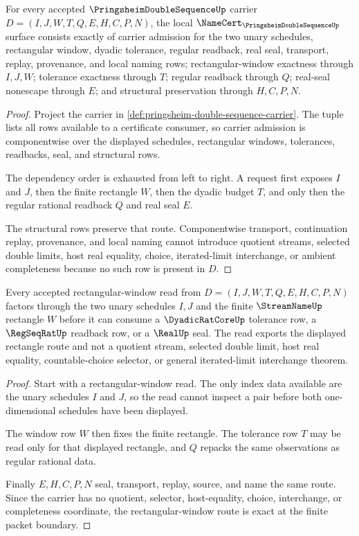 \begin{theorem}
\label{thm:pringsheim-double-sequence-namecert-obligations}
For every accepted $\PringsheimDoubleSequenceUp$ carrier $D=(I,J,W,T,Q,E,H,C,P,N)$, the local $\NameCert_{\PringsheimDoubleSequenceUp}$ surface consists exactly of carrier admission for the two unary schedules, rectangular window, dyadic tolerance, regular readback, real seal, transport, replay, provenance, and local naming rows; rectangular-window exactness through $I,J,W$; tolerance exactness through $T$; regular readback through $Q$; real-seal nonescape through $E$; and structural preservation through $H,C,P,N$.
\end{theorem}
\begin{proof}
Project the carrier in \autoref{def:pringsheim-double-sequence-carrier}. The tuple lists all rows available to a certificate consumer, so carrier admission is componentwise over the displayed schedules, rectangular windows, tolerances, readbacks, seal, and structural rows.

The dependency order is exhausted from left to right. A request first exposes $I$ and $J$, then the finite rectangle $W$, then the dyadic budget $T$, and only then the regular rational readback $Q$ and real seal $E$.

The structural rows preserve that route. Componentwise transport, continuation replay, provenance, and local naming cannot introduce quotient streams, selected double limits, host real equality, choice, iterated-limit interchange, or ambient completeness because no such row is present in $D$.
\end{proof}

\begin{theorem}
\label{thm:pringsheim-double-sequence-rectangular-window-exactness}
Every accepted rectangular-window read from $D=(I,J,W,T,Q,E,H,C,P,N)$ factors through the two unary schedules $I,J$ and the finite $\StreamNameUp$ rectangle $W$ before it can consume a $\DyadicRatCoreUp$ tolerance row, a $\RegSeqRatUp$ readback row, or a $\RealUp$ seal. The read exports the displayed rectangle route and not a quotient stream, selected double limit, host real equality, countable-choice selector, or general iterated-limit interchange theorem.
\end{theorem}
\begin{proof}
Start with a rectangular-window read. The only index data available are the unary schedules $I$ and $J$, so the read cannot inspect a pair before both one-dimensional schedules have been displayed.

The window row $W$ then fixes the finite rectangle. The tolerance row $T$ may be read only for that displayed rectangle, and $Q$ repacks the same observations as regular rational data.

Finally $E,H,C,P,N$ seal, transport, replay, source, and name the same route. Since the carrier has no quotient, selector, host-equality, choice, interchange, or completeness coordinate, the rectangular-window route is exact at the finite packet boundary.
\end{proof}

